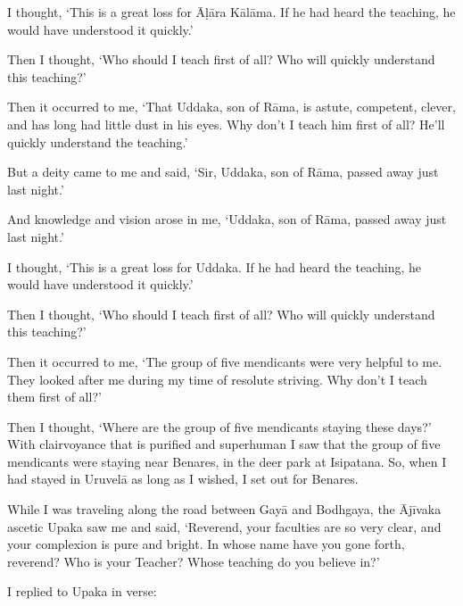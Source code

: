 \documentclass[12pt,openany]{book}%
\begin{document}
I thought, ‘This is a great loss for \textsanskrit{Āḷāra} \textsanskrit{Kālāma}. If he had heard the teaching, he would have understood it quickly.’ 

Then I thought, ‘Who should I teach first of all? Who will quickly understand this teaching?’ 

Then it occurred to me, ‘That Uddaka, son of \textsanskrit{Rāma}, is astute, competent, clever, and has long had little dust in his eyes. Why don’t I teach him first of all? He’ll quickly understand the teaching.’ 

But a deity came to me and said, ‘Sir, Uddaka, son of \textsanskrit{Rāma}, passed away just last night.’ 

And knowledge and vision arose in me, ‘Uddaka, son of \textsanskrit{Rāma}, passed away just last night.’ 

I thought, ‘This is a great loss for Uddaka. If he had heard the teaching, he would have understood it quickly.’ 

Then I thought, ‘Who should I teach first of all? Who will quickly understand this teaching?’ 

Then it occurred to me, ‘The group of five mendicants were very helpful to me. They looked after me during my time of resolute striving. Why don’t I teach them first of all?’ 

Then I thought, ‘Where are the group of five mendicants staying these days?’ With clairvoyance that is purified and superhuman I saw that the group of five mendicants were staying near Benares, in the deer park at Isipatana. So, when I had stayed in \textsanskrit{Uruvelā} as long as I wished, I set out for Benares. 

While I was traveling along the road between \textsanskrit{Gayā} and Bodhgaya, the \textsanskrit{Ājīvaka} ascetic Upaka saw me and said, ‘Reverend, your faculties are so very clear, and your complexion is pure and bright. In whose name have you gone forth, reverend? Who is your Teacher? Whose teaching do you believe in?’ 

I replied to Upaka in verse: 
\end{document}
